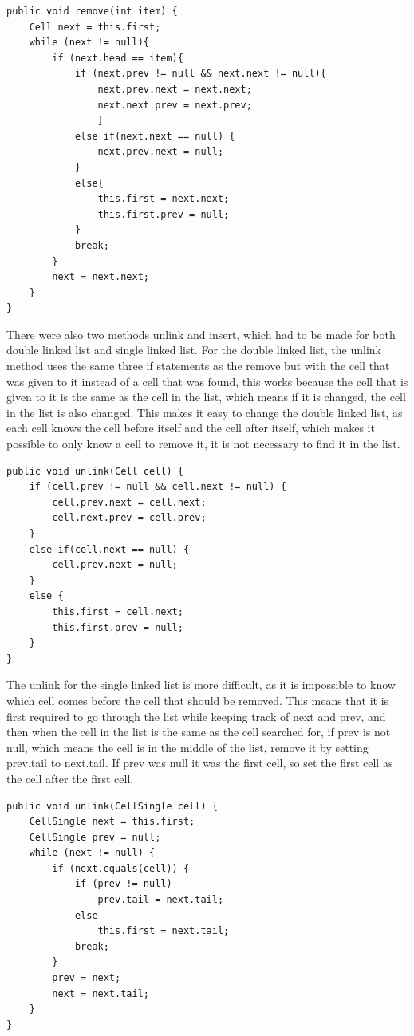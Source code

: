 \documentclass[a4paper,11pt]{article}
\begin{document}
\begin{verbatim}
public void remove(int item) {
    Cell next = this.first;
    while (next != null){
        if (next.head == item){
            if (next.prev != null && next.next != null){
                next.prev.next = next.next;
                next.next.prev = next.prev;
                }
            else if(next.next == null) {
                next.prev.next = null;
            }
            else{
                this.first = next.next;
                this.first.prev = null;   
            }
            break;
        }
        next = next.next;
    }
}    
\end{verbatim}
\noindent
There were also two methods unlink and insert, which had to be made for both double linked list and single linked list. 
For the double linked list, the unlink method uses the same three if statements as the remove but with the cell that was given to it instead of a cell that was found,
this works because the cell that is given to it is the same as the cell in the list, which means if it is changed, the cell in the list is also changed. This makes it easy to change the 
double linked list, as each cell knows the cell before itself and the cell after itself, which makes it possible to only know a cell to remove it, it is not necessary to find it in the list.
\begin{verbatim}
public void unlink(Cell cell) {
    if (cell.prev != null && cell.next != null) {
        cell.prev.next = cell.next;
        cell.next.prev = cell.prev;
    }
    else if(cell.next == null) {
        cell.prev.next = null;
    }
    else {
        this.first = cell.next;
        this.first.prev = null;   
    }  
}    
\end{verbatim}
The unlink for the single linked list is more difficult, as it is impossible to know which cell comes before the cell that should be removed. This means that 
it is first required to go through the list while keeping track of next and prev, and then when the cell in the list is the same as the cell searched for, if prev is not null, which means the cell is in the middle of the list, 
remove it by setting prev.tail to next.tail. If prev was null it was the first cell, so set the first cell as the cell after the first cell.
\begin{verbatim}
public void unlink(CellSingle cell) {
    CellSingle next = this.first;
    CellSingle prev = null;
    while (next != null) {
        if (next.equals(cell)) {
            if (prev != null)
                prev.tail = next.tail;
            else
                this.first = next.tail;
            break;
        }  
        prev = next;
        next = next.tail;   
    }
}
\end{verbatim}
\end{document}
